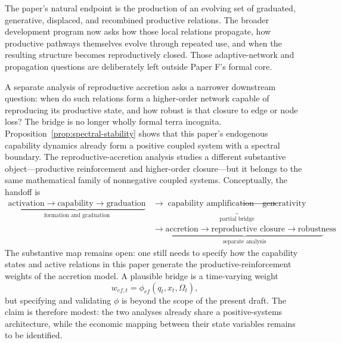 The paper's natural endpoint is the production of an evolving set of graduated, generative, displaced, and recombined productive relations. The broader development program now asks how those local relations propagate, how productive pathways themselves evolve through repeated use, and when the resulting structure becomes reproductively closed. Those adaptive-network and propagation questions are deliberately left outside Paper F's formal core.

A separate analysis of reproductive accretion asks a narrower downstream question: when do such relations form a higher-order network capable of reproducing its productive state, and how robust is that closure to edge or node loss? The bridge is no longer wholly formal terra incognita. Proposition~\ref{prop:spectral-stability} shows that this paper's endogenous capability dynamics already form a positive coupled system with a spectral boundary. The reproductive-accretion analysis studies a different substantive object---productive reinforcement and higher-order closure---but it belongs to the same mathematical family of nonnegative coupled systems. Conceptually, the handoff is
\begin{equation}
\begin{aligned}
\underbrace{
\text{activation}\rightarrow\text{capability}\rightarrow\text{graduation}
}_{\text{formation and graduation}}
&\rightarrow
\underbrace{
\text{capability amplification}\rightarrow\text{generativity}
}_{\text{partial bridge}}\\
&\rightarrow
\underbrace{
\text{accretion}\rightarrow\text{reproductive closure}\rightarrow\text{robustness}
}_{\text{separate analysis}}.
\end{aligned}
\label{eq:handoff}
\end{equation}
The substantive map remains open: one still needs to specify how the capability states and active relations in this paper generate the productive-reinforcement weights of the accretion model. A plausible bridge is a time-varying weight
\begin{equation}
w_{ef,t}=\phi_{ef}(q_t,x_t,\Omega_t),
\end{equation}
but specifying and validating $\phi$ is beyond the scope of the present draft. The claim is therefore modest: the two analyses already share a positive-systems architecture, while the economic mapping between their state variables remains to be identified.
